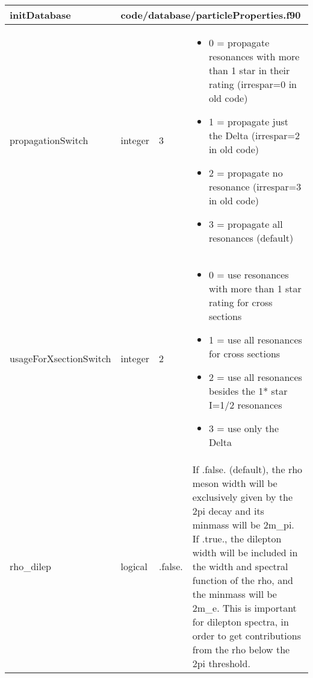 \documentclass{article}
\begin{document}
\begin{longtable}{llll}
\toprule
\textbf{\large{initDatabase}} & \multicolumn{3}{l}{\footnotesize{code/database/particleProperties.f90}}\\*
\midrule
\endfirsthead
\midrule
\endhead
propagationSwitch & \begin{minipage}[t]{2cm}integer\end{minipage} & \begin{minipage}[t]{2cm}3\end{minipage} & \begin{minipage}[t]{12cm}\begin{itemize}\leftmargin0em\itemindent0pt\item 0 = propagate resonances with more than 1 star in their rating   (irrespar=0 in old code)\item 1 = propagate just the Delta (irrespar=2 in old code)\item 2 = propagate no resonance (irrespar=3 in old code)\item 3 = propagate all resonances (default)\end{itemize}\end{minipage}\\*
\midrule
usageForXsectionSwitch & \begin{minipage}[t]{2cm}integer\end{minipage} & \begin{minipage}[t]{2cm}2\end{minipage} & \begin{minipage}[t]{12cm}\begin{itemize}\leftmargin0em\itemindent0pt\item 0 = use resonances with more than 1 star rating for cross sections\item 1 = use all resonances for cross sections\item 2 = use all resonances besides the 1* star I=1/2 resonances\item 3 = use only the Delta\end{itemize}\end{minipage}\\*
\midrule
rho\_dilep & \begin{minipage}[t]{2cm}logical\end{minipage} & \begin{minipage}[t]{2cm}.false.\end{minipage} & \begin{minipage}[t]{12cm}If .false. (default), the rho meson width will be exclusively given by the 2pi decay and its minmass will be 2m\_pi. If .true., the dilepton width will be included in the width and spectral function of the rho, and the minmass will be 2m\_e. This is important for dilepton spectra, in order to get contributions from the rho below the 2pi threshold.\end{minipage}\\*

\end{longtable}
\end{document}
